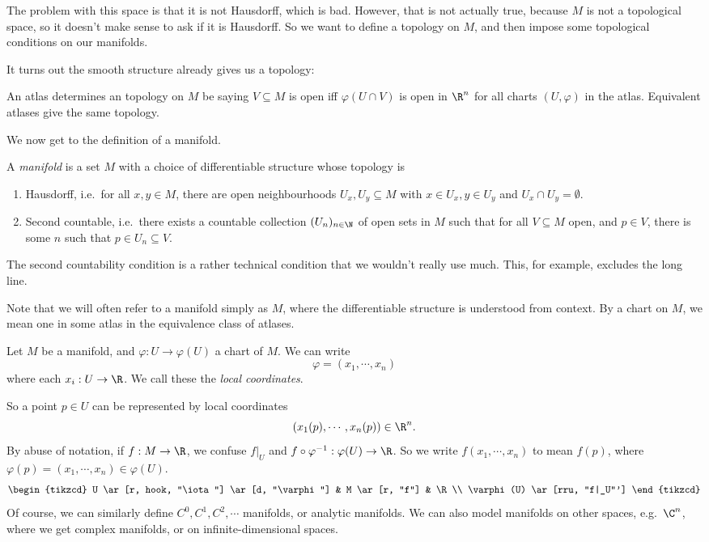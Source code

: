 \documentclass[a4paper]{article}
\begin{document}
The problem with this space is that it is not Hausdorff, which is bad. However, that is not actually true, because $M$ is not a topological space, so it doesn't make sense to ask if it is Hausdorff. So we want to define a topology on $M$, and then impose some topological conditions on our manifolds.

It turns out the smooth structure already gives us a topology:

\begin{ex}
  An atlas determines an topology on $M$ be saying $V \subseteq M$ is open iff $\varphi(U \cap V)$ is open in $\R^n$ for all charts $(U, \varphi)$ in the atlas. Equivalent atlases give the same topology.
\end{ex}

We now get to the definition of a manifold.

\begin{defi}[Manifold]
  A \emph{manifold} is a set $M$ with a choice of differentiable structure whose topology is
  \begin{enumerate}
    \item Hausdorff, i.e.\ for all $x, y \in M$, there are open neighbourhoods $U_x, U_y \subseteq M$ with $x \in U_x, y \in U_y$ and $U_x \cap U_y = \emptyset$.
    \item Second countable, i.e.\ there exists a countable collection $(U_n)_{n \in \N}$ of open sets in $M$ such that for all $V \subseteq M$ open, and $p \in V$, there is some $n$ such that $p \in U_n \subseteq V$.
  \end{enumerate}
\end{defi}
The second countability condition is a rather technical condition that we wouldn't really use much. This, for example, excludes the long line.

Note that we will often refer to a manifold simply as $M$, where the differentiable structure is understood from context. By a chart on $M$, we mean one in some atlas in the equivalence class of atlases.

\begin{defi}
  Let $M$ be a manifold, and $\varphi: U \to \varphi(U)$ a chart of $M$. We can write
  \[
    \varphi = (x_1, \cdots, x_n)
  \]
  where each $x_i: U \to \R$. We call these the \emph{local coordinates}.
\end{defi}
So a point $p \in U$ can be represented by local coordinates
\[
  (x_1(p), \cdots, x_n(p)) \in \R^n.
\]
By abuse of notation, if $f: M \to \R$, we confuse $f|_U$ and $f \circ \varphi^{-1}: \varphi(U) \to \R$. So we write $f(x_1, \cdots, x_n)$ to mean $f(p)$, where $\varphi(p) = (x_1, \cdots, x_n) \in \varphi(U)$.
\[
  \begin{tikzcd}
    U \ar[r, hook, "\iota"] \ar[d, "\varphi"] & M \ar[r, "f"] & \R\\
    \varphi(U) \ar[rru, "f|_U"']
  \end{tikzcd}
\]
Of course, we can similarly define $C^0, C^1, C^2, \cdots$ manifolds, or analytic manifolds. We can also model manifolds on other spaces, e.g.\ $\C^n$, where we get complex manifolds, or on infinite-dimensional spaces.
\end{document}
